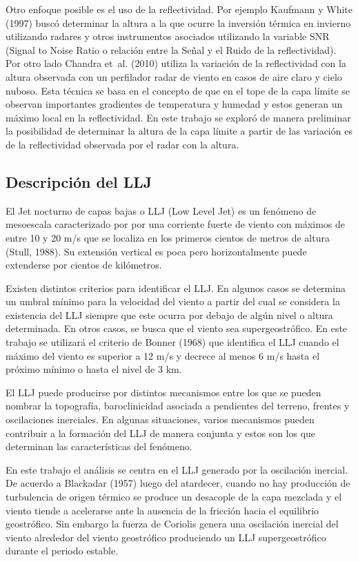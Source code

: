 \documentclass[12pt,spanish,oneside]{book}
\begin{document}
Otro enfoque posible es el uso de la reflectividad. Por ejemplo Kaufmann
y White (1997) buscó determinar la altura a la que ocurre la inversión
térmica en invierno utilizando radares y otros instrumentos asociados
utilizando la variable SNR (Signal to Noise Ratio o relación entre la
Señal y el Ruido de la reflectividad). Por otro lado Chandra et~al.
(2010) utiliza la variación de la reflectividad con la altura observada
con un perfilador radar de viento en casos de aire claro y cielo nuboso.
Esta técnica se basa en el concepto de que en el tope de la capa límite
se observan importantes gradientes de temperatura y humedad y estos
generan un máximo local en la reflectividad. En este trabajo se exploró
de manera preliminar la posibilidad de determinar la altura de la capa
límite a partir de las variación es de la reflectividad observada por el
radar con la altura.

\subsection{Descripción del LLJ}\label{descripcion-del-llj}

El Jet nocturno de capas bajas o LLJ (Low Level Jet) es un fenómeno de
mesoescala caracterizado por por una corriente fuerte de viento con
máximos de entre 10 y 20 m/s que se localiza en los primeros cientos de
metros de altura (Stull, 1988). Su extensión vertical es poca pero
horizontalmente puede extenderse por cientos de kilómetros.

Existen distintos criterios para identificar el LLJ. En algunos casos se
determina un umbral mínimo para la velocidad del viento a partir del
cual se considera la existencia del LLJ siempre que este ocurra por
debajo de algún nivel o altura determinada. En otros casos, se busca que
el viento sea supergeostrófico. En este trabajo se utilizará el criterio
de Bonner (1968) que identifica el LLJ cuando el máximo del viento es
superior a 12 m/s y decrece al menos 6 m/s hasta el próximo mínimo o
hasta el nivel de 3 km.

El LLJ puede producirse por distintos mecanismos entre los que se pueden
nombrar la topografía, baroclinicidad asociada a pendientes del terreno,
frentes y oscilaciones inerciales. En algunas situaciones, varios
mecanismos pueden contribuir a la formación del LLJ de manera conjunta y
estos son los que determinan las características del fenómeno.

En este trabajo el análisis se centra en el LLJ generado por la
oscilación inercial. De acuerdo a Blackadar (1957) luego del atardecer,
cuando no hay producción de turbulencia de origen térmico se produce un
desacople de la capa mezclada y el viento tiende a acelerarse ante la
ausencia de la fricción hacia el equilibrio geostrófico. Sin embargo la
fuerza de Coriolis genera una oscilación inercial del viento alrededor
del viento geostrófico produciendo un LLJ supergeostrófico durante el
periodo estable.
\end{document}
